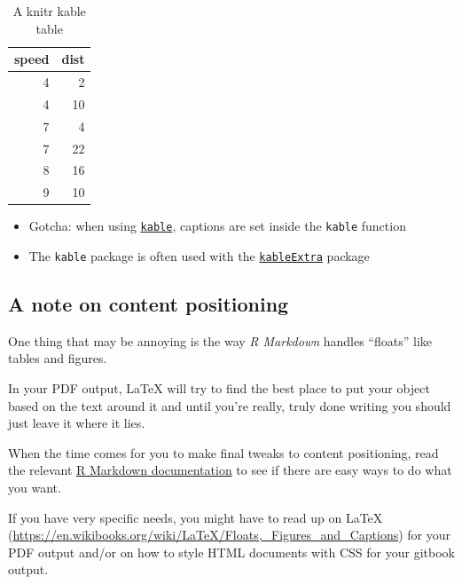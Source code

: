 \documentclass[a4paper, twoside]{templates/ociamthesis}
\providecommand{\tightlist}{%
  \setlength{\itemsep}{0pt}\setlength{\parskip}{0pt}}
\begin{document}
\begin{table}

\caption{\label{tab:cars-table}A knitr kable table}
\centering
\begin{tabular}[t]{r|r}
\hline
speed & dist\\
\hline
4 & 2\\
\hline
4 & 10\\
\hline
7 & 4\\
\hline
7 & 22\\
\hline
8 & 16\\
\hline
9 & 10\\
\hline
\end{tabular}
\end{table}

\begin{itemize}
\tightlist
\item
  Gotcha: when using \href{https://www.rdocumentation.org/packages/knitr/versions/1.21/topics/kable}{\texttt{kable}}, captions are set inside the \texttt{kable} function
\item
  The \texttt{kable} package is often used with the \href{https://cran.r-project.org/web/packages/kableExtra/vignettes/awesome_table_in_html.html}{\texttt{kableExtra}} package
\end{itemize}

\hypertarget{a-note-on-content-positioning}{%
\subsection{A note on content positioning}\label{a-note-on-content-positioning}}

One thing that may be annoying is the way \emph{R Markdown} handles ``floats'' like tables and figures.

In your PDF output, LaTeX will try to find the best place to put your object based on the text around it and until you're really, truly done writing you should just leave it where it lies.

When the time comes for you to make final tweaks to content positioning, read the relevant \href{https://bookdown.org/yihui/rmarkdown/}{R Markdown documentation} to see if there are easy ways to do what you want.

If you have very specific needs, you might have to read up on LaTeX (\url{https://en.wikibooks.org/wiki/LaTeX/Floats,_Figures_and_Captions}) for your PDF output and/or on how to style HTML documents with CSS for your gitbook output.
\end{document}
